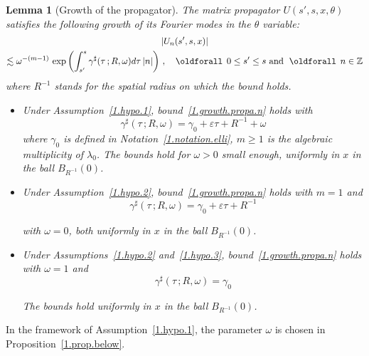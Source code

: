 \documentclass[10pt]{amsart}
\newtheorem{lemm}[cdrthm]{Lemma}
\theoremstyle{definition}
\theoremstyle{plain}
\newcommand*\e{\varepsilon}
\newcommand*\Z{{\mathbb Z}}
\newcommand*\g{\gamma}
\renewcommand*{\forall}{\mathrel{\oldforall}}
\begin{document}
\begin{lemm}[Growth of the propagator]\label{1.lemma.growth.propa}
The matrix propagator $U(s',s,x,\theta)$ satisfies the following growth of its Fourier modes in the $\theta$ variable:
\begin{multline}\label{1.growth.propa.n}
|U_n(s',s,x)|\\ 
\lesssim \omega^{-(m-1)}\,\exp\left(\int_{s'}^{s} \g^{\sharp}(\tau \,;R,\omega) d\tau \, |n|\right)\,, \quad \forall \, 0 \leq s' \leq s \text{ and } \forall \, n\in\Z
\end{multline}
where $R^{-1}$ stands for the spatial radius on which the bound holds.
\begin{itemize}
\item Under Assumption~\ref{1.hypo.1}, bound~\eqref{1.growth.propa.n} holds with
\begin{equation}\label{1.bound.g.sharp}
\g^{\sharp}(\tau \,;R,\omega) = \g_0 + \e \tau + R^{-1} + \omega
\end{equation}
 where $\g_0$ is defined in Notation~\ref{1.notation.elli}, $m \geq 1$ is the algebraic multiplicity of $\lambda_0$. The bounds hold for $\omega >0$ small enough, uniformly in $x$ in the ball $B_{R^{-1}}(0)$.

\item Under Assumption~\ref{1.hypo.2}, bound~\eqref{1.growth.propa.n} holds with $ m =1$ and
\begin{equation}\label{1.bound.g.sharp.bis}
\g^{\sharp}(\tau \,;R,\omega) = \g_0 + \e \tau + R^{-1}
\end{equation}

\noindent with $\omega = 0$, both uniformly in $x$ in the ball $B_{R^{-1}}(0)$.

\item Under Assumptions~\ref{1.hypo.2} and~\ref{1.hypo.3}, bound~\eqref{1.growth.propa.n} holds with $\omega = 1$ and
\begin{equation}\label{1.bound.g.sharp.max}
\g^{\sharp}(\tau \,;R,\omega) = \g_0
\end{equation}

\noindent The bounds hold uniformly in $x$ in the ball $B_{R^{-1}}(0)$.
\end{itemize}
\end{lemm}


In the framework of Assumption~\ref{1.hypo.1}, the parameter $\omega$ is chosen in Proposition~\ref{1.prop.below}.
\end{document}
